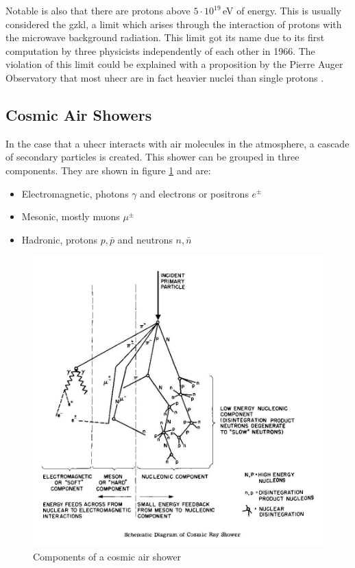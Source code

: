 \documentclass[abstract,toc,los,english,11pt,glossaries]{jluthesis}
\begin{document}
Notable is also that there are protons above $5\cdot10^{19}$\,eV of energy.
This is usually considered the \acrfull{gzkl}, a limit which arises through the interaction of protons with the microwave background radiation. This limit got its name due to its first computation by three physicists independently of each other in 1966. The violation of this limit could be explained with a proposition by the Pierre Auger Observatory that most \acrshort{uhecr} are in fact heavier nuclei than single protons \cite{thepierreaugercollaboration2017inferences}.

\subsection{Cosmic Air Showers}
In the case that a \acrshort{uhecr} interacts with air molecules in the atmosphere, a cascade of secondary particles is created. This shower can be grouped in three components. They are shown in figure \ref{fig:shower-components} and are:
\begin{itemize}
	\item Electromagnetic, photons $\gamma$ and electrons or positrons $e^\pm$
	\item Mesonic, mostly muons $\mu^\pm$
	\item Hadronic, protons $p,\bar{p}$ and neutrons $n,\bar{n}$
\end{itemize}
\begin{figure}[ht!]
	\centering
	\includegraphics[width=0.6\linewidth]{data/shower-components}
	\caption{Components of a cosmic air shower \cite{desy-zeuthen}}
	\label{fig:shower-components}
\end{figure}
\end{document}
